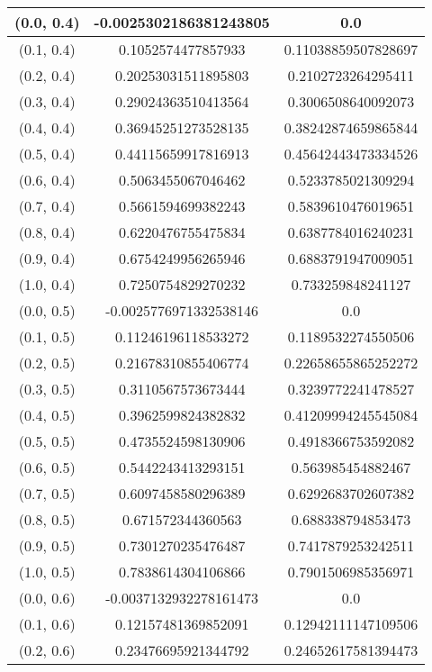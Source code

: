 \begin{table}[H]
\begin{tabular}{|c|c|c|}
\hline
(0.0, 0.4) & -0.0025302186381243805 & 0.0 \\
\hline
(0.1, 0.4) & 0.1052574477857933 & 0.11038859507828697 \\
\hline
(0.2, 0.4) & 0.20253031511895803 & 0.2102723264295411 \\
\hline
(0.3, 0.4) & 0.29024363510413564 & 0.3006508640092073 \\
\hline
(0.4, 0.4) & 0.36945251273528135 & 0.38242874659865844 \\
\hline
(0.5, 0.4) & 0.44115659917816913 & 0.45642443473334526 \\
\hline
(0.6, 0.4) & 0.5063455067046462 & 0.5233785021309294 \\
\hline
(0.7, 0.4) & 0.5661594699382243 & 0.5839610476019651 \\
\hline
(0.8, 0.4) & 0.6220476755475834 & 0.6387784016240231 \\
\hline
(0.9, 0.4) & 0.6754249956265946 & 0.6883791947009051 \\
\hline
(1.0, 0.4) & 0.7250754829270232 & 0.733259848241127 \\
\hline
\hline
(0.0, 0.5) & -0.0025776971332538146 & 0.0 \\
\hline
(0.1, 0.5) & 0.11246196118533272 & 0.1189532274550506 \\
\hline
(0.2, 0.5) & 0.21678310855406774 & 0.22658655865252272 \\
\hline
(0.3, 0.5) & 0.3110567573673444 & 0.3239772241478527 \\
\hline
(0.4, 0.5) & 0.3962599824382832 & 0.41209994245545084 \\
\hline
(0.5, 0.5) & 0.4735524598130906 & 0.4918366753592082 \\
\hline
(0.6, 0.5) & 0.5442243413293151 & 0.563985454882467 \\
\hline
(0.7, 0.5) & 0.6097458580296389 & 0.6292683702607382 \\
\hline
(0.8, 0.5) & 0.671572344360563 & 0.688338794853473 \\
\hline
(0.9, 0.5) & 0.7301270235476487 & 0.7417879253242511 \\
\hline
(1.0, 0.5) & 0.7838614304106866 & 0.7901506985356971 \\
\hline
\hline
(0.0, 0.6) & -0.0037132932278161473 & 0.0 \\
\hline
(0.1, 0.6) & 0.12157481369852091 & 0.12942111147109506 \\
\hline
(0.2, 0.6) & 0.23476695921344792 & 0.24652617581394473 \\

\end{tabular}
\end{table}
